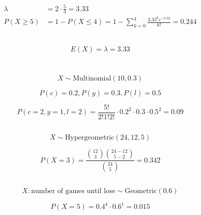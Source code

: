 \documentclass{homework}
\begin{document}
\begin{align*}
    \lambda &= 2 \cdot \frac{5}{3} = 3.33 \\
    P(X \geq 5) &= 1 - P(X \leq 4) = 1 - \sum_{k=0}^4 \frac{3.33^k e^{-3.33}}{k!} = 0.244
\end{align*}

\subsection{}

\begin{align*}
    E(X) = \lambda = 3.33
\end{align*}

\section{}

\subsection{}

\[
X \sim \text{Multinomial}(10, 0.3)
\]

\[
P(c)=0.2, P(y)=0.3, P(l)=0.5
\]

\[
    P(c=2, y=1, l=2) = \frac{5!}{2!1!2!} \cdot 0.2^2 \cdot 0.3 \cdot 0.5^2 = 0.09
\]

\subsection{}

\[X \sim \text{Hypergeometric}(24, 12, 5)\]

\[
P(X=3) = \frac{\binom{12}{3}\binom{24 - 12}{5 - 2}}{\binom{24}{5}} = 0.342
\]

\subsection{}

\[
X: \text{number of games until lose} \sim \text{Geometric}(0.6)
\]

\[
P(X=5) = 0.4^4 \cdot 0.6^1 = 0.015
\]
\end{document}
